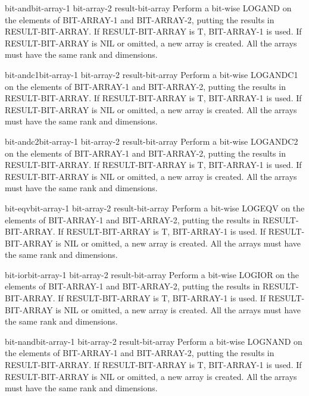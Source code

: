 \documentclass[10pt,english]{book}
\begin{document}
\begin{function}{bit-and}{bit-array-1 bit-array-2 \op result-bit-array}
  Perform a bit-wise LOGAND on the elements of BIT-ARRAY-1 and BIT-ARRAY-2,
  putting the results in RESULT-BIT-ARRAY. If RESULT-BIT-ARRAY is T,
  BIT-ARRAY-1 is used. If RESULT-BIT-ARRAY is NIL or omitted, a new array is
  created. All the arrays must have the same rank and dimensions.
\end{function}

\begin{function}{bit-andc1}{bit-array-1 bit-array-2 \op result-bit-array}
  Perform a bit-wise LOGANDC1 on the elements of BIT-ARRAY-1 and BIT-ARRAY-2,
  putting the results in RESULT-BIT-ARRAY. If RESULT-BIT-ARRAY is T,
  BIT-ARRAY-1 is used. If RESULT-BIT-ARRAY is NIL or omitted, a new array is
  created. All the arrays must have the same rank and dimensions.
\end{function}

\begin{function}{bit-andc2}{bit-array-1 bit-array-2 \op result-bit-array}
  Perform a bit-wise LOGANDC2 on the elements of BIT-ARRAY-1 and BIT-ARRAY-2,
  putting the results in RESULT-BIT-ARRAY. If RESULT-BIT-ARRAY is T,
  BIT-ARRAY-1 is used. If RESULT-BIT-ARRAY is NIL or omitted, a new array is
  created. All the arrays must have the same rank and dimensions.
\end{function}

\begin{function}{bit-eqv}{bit-array-1 bit-array-2 \op result-bit-array}
  Perform a bit-wise LOGEQV on the elements of BIT-ARRAY-1 and BIT-ARRAY-2,
  putting the results in RESULT-BIT-ARRAY. If RESULT-BIT-ARRAY is T,
  BIT-ARRAY-1 is used. If RESULT-BIT-ARRAY is NIL or omitted, a new array is
  created. All the arrays must have the same rank and dimensions.
\end{function}

\begin{function}{bit-ior}{bit-array-1 bit-array-2 \op result-bit-array}
  Perform a bit-wise LOGIOR on the elements of BIT-ARRAY-1 and BIT-ARRAY-2,
  putting the results in RESULT-BIT-ARRAY. If RESULT-BIT-ARRAY is T,
  BIT-ARRAY-1 is used. If RESULT-BIT-ARRAY is NIL or omitted, a new array is
  created. All the arrays must have the same rank and dimensions.
\end{function}

\begin{function}{bit-nand}{bit-array-1 bit-array-2 \op result-bit-array}
  Perform a bit-wise LOGNAND on the elements of BIT-ARRAY-1 and BIT-ARRAY-2,
  putting the results in RESULT-BIT-ARRAY. If RESULT-BIT-ARRAY is T,
  BIT-ARRAY-1 is used. If RESULT-BIT-ARRAY is NIL or omitted, a new array is
  created. All the arrays must have the same rank and dimensions.
\end{function}
\end{document}
